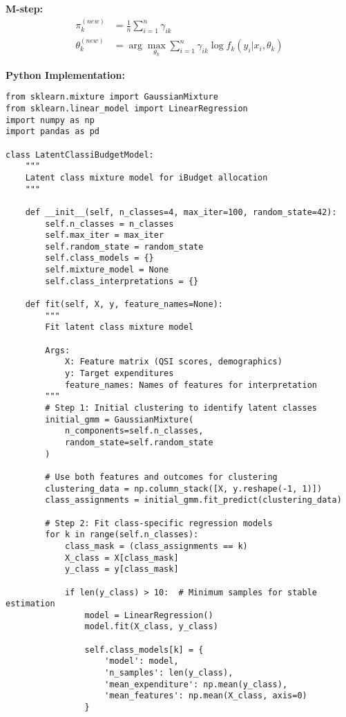 \documentclass[12pt]{article}
\begin{document}
\textbf{M-step:}
\begin{align}
\pi_k^{(new)} &= \frac{1}{n}\sum_{i=1}^{n} \gamma_{ik} \\
\theta_k^{(new)} &= \arg\max_{\theta_k} \sum_{i=1}^{n} \gamma_{ik} \log f_k(y_i | x_i, \theta_k)
\end{align}

\textbf{Python Implementation:}
\begin{lstlisting}
from sklearn.mixture import GaussianMixture
from sklearn.linear_model import LinearRegression
import numpy as np
import pandas as pd

class LatentClassiBudgetModel:
    """
    Latent class mixture model for iBudget allocation
    """
    
    def __init__(self, n_classes=4, max_iter=100, random_state=42):
        self.n_classes = n_classes
        self.max_iter = max_iter
        self.random_state = random_state
        self.class_models = {}
        self.mixture_model = None
        self.class_interpretations = {}
        
    def fit(self, X, y, feature_names=None):
        """
        Fit latent class mixture model
        
        Args:
            X: Feature matrix (QSI scores, demographics)
            y: Target expenditures
            feature_names: Names of features for interpretation
        """
        # Step 1: Initial clustering to identify latent classes
        initial_gmm = GaussianMixture(
            n_components=self.n_classes,
            random_state=self.random_state
        )
        
        # Use both features and outcomes for clustering
        clustering_data = np.column_stack([X, y.reshape(-1, 1)])
        class_assignments = initial_gmm.fit_predict(clustering_data)
        
        # Step 2: Fit class-specific regression models
        for k in range(self.n_classes):
            class_mask = (class_assignments == k)
            X_class = X[class_mask]
            y_class = y[class_mask]
            
            if len(y_class) > 10:  # Minimum samples for stable estimation
                model = LinearRegression()
                model.fit(X_class, y_class)
                
                self.class_models[k] = {
                    'model': model,
                    'n_samples': len(y_class),
                    'mean_expenditure': np.mean(y_class),
                    'mean_features': np.mean(X_class, axis=0)
                }
        

\end{lstlisting}
\end{document}
